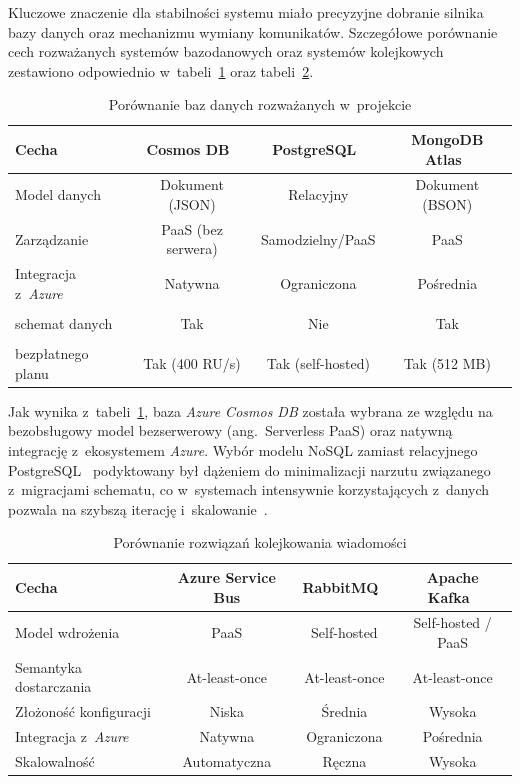 \documentclass[a4paper,12pt,reqno]{article}
\begin{document}
Kluczowe znaczenie dla stabilności systemu miało precyzyjne dobranie silnika bazy danych oraz mechanizmu wymiany komunikatów. Szczegółowe porównanie cech rozważanych systemów bazodanowych oraz systemów kolejkowych zestawiono odpowiednio w~tabeli~\ref{tab:porownanie_baz} oraz tabeli~\ref{tab:porownanie_kolejek}.

\begin{table}[H]
	\centering
	\caption{Porównanie baz danych rozważanych w~projekcie}
	\label{tab:porownanie_baz}
	\begin{tabular}{lccc}
		\toprule
		\textbf{Cecha} & \textbf{Cosmos DB}~\cite{cosmosdb} & \textbf{PostgreSQL}~\cite{postgresql} & \textbf{MongoDB Atlas}~\cite{mongodb_atlas} \\
		\midrule
		Model danych & Dokument (JSON) & Relacyjny & Dokument (BSON) \\
		\rule{0pt}{13pt}Zarządzanie & PaaS (bez serwera) & Samodzielny/PaaS & PaaS \\
		\rule{0pt}{13pt}Integracja z~\textit{Azure} & Natywna & Ograniczona & Pośrednia \\
		\makecell[l]{\rule{0pt}{13pt}Elastyczny \\ schemat danych} & Tak & Nie & Tak \\
		\makecell[l]{\rule{0pt}{13pt}Dostępność \\ bezpłatnego planu} & Tak (400 RU/s) & Tak (self-hosted) & Tak (512 MB) \\
		\bottomrule
	\end{tabular}
\end{table}

\noindent Jak wynika z~tabeli~\ref{tab:porownanie_baz}, baza \textit{Azure Cosmos DB} została wybrana ze względu na bezobsługowy model bezserwerowy (ang.~Serverless PaaS) oraz natywną integrację z~ekosystemem \textit{Azure}. Wybór modelu NoSQL zamiast relacyjnego PostgreSQL~\cite{postgresql} podyktowany był dążeniem do minimalizacji narzutu związanego z~migracjami schematu, co w~systemach intensywnie korzystających z~danych pozwala na szybszą iterację i~skalowanie~\cite{kleppmann2017}.

\begin{table}[h!]
	\centering
	\caption{Porównanie rozwiązań kolejkowania wiadomości}
	\label{tab:porownanie_kolejek}
	\begin{tabular}{lccc}
		\toprule
		\textbf{Cecha} & \textbf{Azure Service Bus} & \textbf{RabbitMQ}~\cite{rabbitmq} & \textbf{Apache Kafka}~\cite{apache_kafka} \\
		\midrule
		Model wdrożenia & PaaS & Self-hosted & Self-hosted / PaaS \\
		\rule{0pt}{13pt}Semantyka dostarczania & At-least-once & At-least-once & At-least-once \\
		\rule{0pt}{13pt}Złożoność konfiguracji & Niska & Średnia & Wysoka \\
		\rule{0pt}{13pt}Integracja z~\textit{Azure} & Natywna & Ograniczona & Pośrednia \\
		\rule{0pt}{13pt}Skalowalność & Automatyczna & Ręczna & Wysoka \\
		\bottomrule
	\end{tabular}
\end{table}
\end{document}
